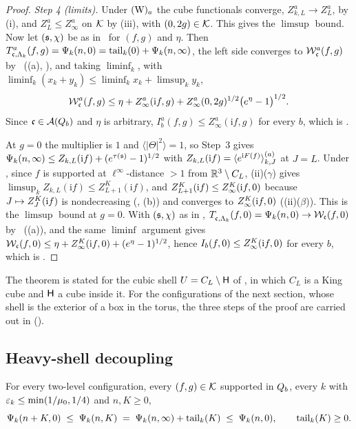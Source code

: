 \begin{proof}
\emph{Step 4 (limits).} Under $(\mathrm W)_{a}$ the cube functionals converge, $Z^a_{k,L}\to Z^a_L$, by (i), and $Z^a_L\le Z^a_\infty$ on $\mathcal K$ by (iii), with $(0,2g)\in\mathcal K$. This gives the $\limsup$ bound. Now let $(\mathfrak s,\chi)$ be as in \SHa\ for $(f,g)$ and $\eta$. Then $T^{a}_{\mathfrak c,\Lambda_k}(f,g)=\Psi_k(n,0)=\operatorname{tail}_k(0)+\Psi_k(n,\infty)$, the left side converges to $\mathcal W^a_{\mathfrak c}(f,g)$ by \Ka\ ((a), ), and taking $\liminf_k$, with $\liminf_k(x_k+y_k)\le\liminf_kx_k+\limsup_ky_k$,
\[
\mathcal W^a_{\mathfrak c}(f,g)\le\eta+Z^a_\infty(\mathrm if,g)+Z^a_\infty(0,2g)^{1/2}\big(e^{\eta}-1\big)^{1/2}.
\]
Since $\mathfrak c\in\mathcal A(Q_{b})$ and $\eta$ is arbitrary, $I^a_b(f,g)\le Z^a_\infty(\mathrm if,g)$ for every $b$, which is \TIa.

At $g=0$ the multiplier is $1$ and $\langle|\Theta|^2\rangle=1$, so Step~3 gives $\Psi_k(n,\infty)\le Z_{k,L}(\mathrm if)+(e^{\tau(\mathfrak s)}-1)^{1/2}$ with $Z_{k,L}(\mathrm if)=\langle e^{\mathrm iF(f)}\rangle^{(a)}_{k,J}$ at $J=L$. Under \EC, since $f$ is supported at $\ell^\infty$-distance $>1$ from $\mathbb R^3\setminus C_L$, (ii)($\gamma$) gives $\limsup_kZ_{k,L}(\mathrm if)\le Z^K_{L+1}(\mathrm if)$, and $Z^K_{L+1}(\mathrm if)\le Z^{K}_{\infty}(\mathrm if,0)$ because $J\mapsto Z^{K}_{J}(\mathrm if)$ is nondecreasing (, (b)) and converges to $Z^{K}_{\infty}(\mathrm if,0)$ ((ii)($\beta$)). This is the $\limsup$ bound at $g=0$. With $(\mathfrak s,\chi)$ as in \SHz, $T^{}_{\mathfrak c,\Lambda_k}(f,0)=\Psi_k(n,0)\to\mathcal W_{\mathfrak c}(f,0)$ by \Kz\ ((a)), and the same $\liminf$ argument gives $\mathcal W_{\mathfrak c}(f,0)\le\eta+Z^{K}_{\infty}(\mathrm if,0)+(e^\eta-1)^{1/2}$, hence $I_b(f,0)\le Z^{K}_{\infty}(\mathrm if,0)$ for every $b$, which is \TIz.
\end{proof}

The theorem is stated for the cubic shell $U=C_L\setminus\mathsf H$ of , in which $C_L$ is a King cube and $\mathsf H$ a cube inside it. For the configurations of the next section, whose shell is the exterior of a box in the torus, the three steps of the proof are carried out in  (\DSh).

\subsection{Heavy-shell decoupling}

\begin{lemma}\label{rot:lem:TL}
For every two-level configuration, every $(f,g)\in\mathcal K$ supported in $Q_{b}$, every $k$ with $\varepsilon_k\le\min(1/\mu_0,1/4)$ and $n,K\ge0$,
\[
\Psi_k(n+K,0)\;\le\;\Psi_k(n,K)\;=\;\Psi_k(n,\infty)+\operatorname{tail}_k(K)\;\le\;\Psi_k(n,0),\qquad\operatorname{tail}_k(K)\ge0 .
\]
\end{lemma}

